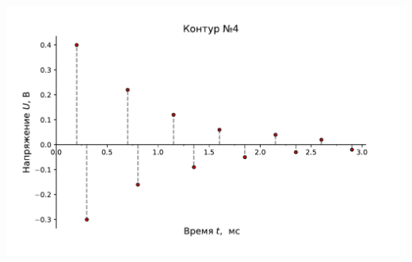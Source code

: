 \documentclass[ a4paper]{article}
\begin{document}
\begin{center}
	\includegraphics[scale=0.65]{pic4.pdf}
\end{center}
	
\end{document}
